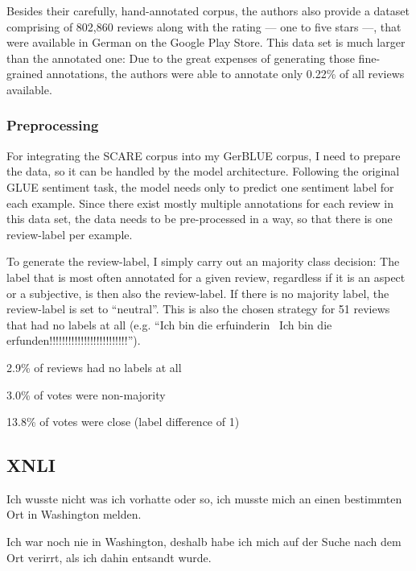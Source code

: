 Besides their carefully, hand-annotated corpus, the authors also provide a dataset comprising of 802,860 reviews along with the rating --- one to five stars ---, that were available in German on the Google Play Store.
This data set is much larger than the annotated one: Due to the great expenses of generating those fine-grained annotations, the authors were able to annotate only 0.22\% of all reviews available.



\subsubsection{Preprocessing}

For integrating the SCARE corpus into my GerBLUE corpus, I need to prepare the data, so it can be handled by the model architecture.
Following the original GLUE sentiment task, the model needs only to predict one sentiment label for each example.
Since there exist mostly multiple annotations for each review in this data set, the data needs to be pre-processed in a way, so that there is one review-label per example.

To generate the review-label, I simply carry out an majority class decision:
The label that is most often annotated for a given review, regardless if it is an aspect or a subjective, is then also the review-label.
If there is no majority label, the review-label is set to ``neutral''.
This is also the chosen strategy for 51 reviews that had no labels at all (e.g. ``Ich bin die erfuinderin \textbar \textbar\ Ich bin die erfunden!!!!!!!!!!!!!!!!!!!!!!!!!'').

2.9\% of reviews had no labels at all 

3.0\% of votes were non-majority

13.8\% of votes were close (label difference of 1)

\subsection{XNLI}

\cite{conneau2018xnli}

\begin{examples}
	\label{ex:xnli}
	\item Ich wusste nicht was ich vorhatte oder so, ich musste mich an einen bestimmten Ort in Washington melden.

        Ich war noch nie in Washington, deshalb habe ich mich auf der Suche nach dem Ort verirrt, als ich dahin entsandt wurde.
\end{examples}

